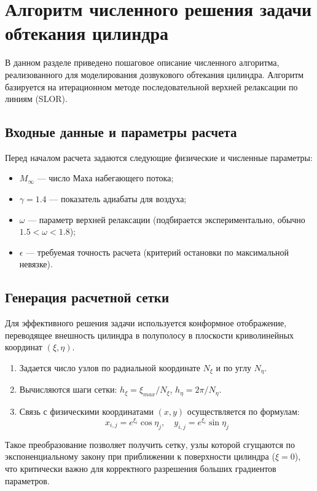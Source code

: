 \section{Алгоритм численного решения задачи обтекания цилиндра}

В данном разделе приведено пошаговое описание численного алгоритма, реализованного для моделирования дозвукового обтекания цилиндра. Алгоритм базируется на итерационном методе последовательной верхней релаксации по линиям (SLOR).

\subsection{Входные данные и параметры расчета}

Перед началом расчета задаются следующие физические и численные параметры:
\begin{itemize}
    \item $M_\infty$ --- число Маха набегающего потока;
    \item $\gamma = 1.4$ --- показатель адиабаты для воздуха;
    \item $\omega$ --- параметр верхней релаксации (подбирается экспериментально, обычно $1.5 < \omega < 1.8$);
    \item $\epsilon$ --- требуемая точность расчета (критерий остановки по максимальной невязке).
\end{itemize}

\subsection{Генерация расчетной сетки}

Для эффективного решения задачи используется конформное отображение, переводящее внешность цилиндра в полуполосу в плоскости криволинейных координат $(\xi, \eta)$.

\begin{enumerate}
    \item Задается число узлов по радиальной координате $N_\xi$ и по углу $N_\eta$.
    \item Вычисляются шаги сетки: $h_\xi = \xi_{max} / N_\xi$, $h_\eta = 2\pi / N_\eta$.
    \item Связь с физическими координатами $(x, y)$ осуществляется по формулам:
    \[ x_{i,j} = e^{\xi_i} \cos \eta_j, \quad y_{i,j} = e^{\xi_i} \sin \eta_j \]
\end{enumerate}
Такое преобразование позволяет получить сетку, узлы которой сгущаются по экспоненциальному закону при приближении к поверхности цилиндра ($\xi=0$), что критически важно для корректного разрешения больших градиентов параметров.

